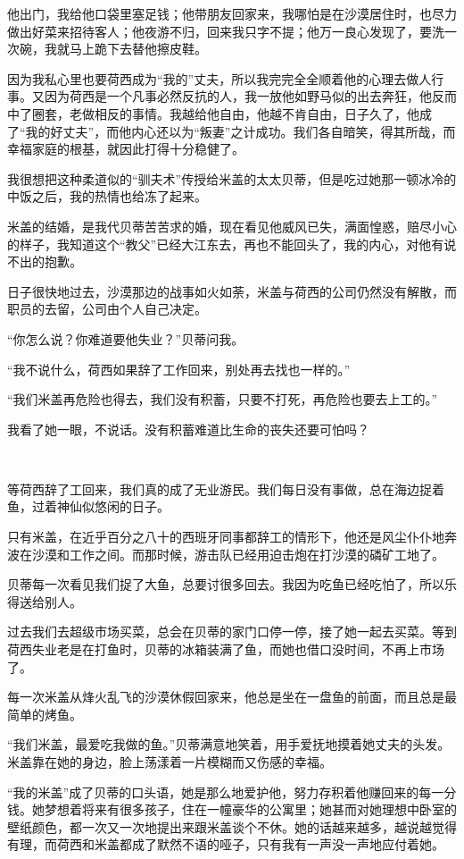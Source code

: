 \par 他出门，我给他口袋里塞足钱；他带朋友回家来，我哪怕是在沙漠居住时，也尽力做出好菜来招待客人；他夜游不归，回来我只字不提；他万一良心发现了，要洗一次碗，我就马上跪下去替他擦皮鞋。
\par 因为我私心里也要荷西成为“我的”丈夫，所以我完完全全顺着他的心理去做人行事。又因为荷西是一个凡事必然反抗的人，我一放他如野马似的出去奔狂，他反而中了圈套，老做相反的事情。我越给他自由，他越不肯自由，日子久了，他成了“我的好丈夫”，而他内心还以为“叛妻”之计成功。我们各自暗笑，得其所哉，而幸福家庭的根基，就因此打得十分稳健了。
\par 我很想把这种柔道似的“驯夫术”传授给米盖的太太贝蒂，但是吃过她那一顿冰冷的中饭之后，我的热情也给冻了起来。
\par 米盖的结婚，是我代贝蒂苦苦求的婚，现在看见他威风已失，满面惶惑，赔尽小心的样子，我知道这个“教父”已经大江东去，再也不能回头了，我的内心，对他有说不出的抱歉。
\par 日子很快地过去，沙漠那边的战事如火如荼，米盖与荷西的公司仍然没有解散，而职员的去留，公司由个人自己决定。
\par “你怎么说？你难道要他失业？”贝蒂问我。
\par “我不说什么，荷西如果辞了工作回来，别处再去找也一样的。”
\par “我们米盖再危险也得去，我们没有积蓄，只要不打死，再危险也要去上工的。”
\par 我看了她一眼，不说话。没有积蓄难道比生命的丧失还要可怕吗？
\par  
\par 等荷西辞了工回来，我们真的成了无业游民。我们每日没有事做，总在海边捉着鱼，过着神仙似悠闲的日子。
\par 只有米盖，在近乎百分之八十的西班牙同事都辞工的情形下，他还是风尘仆仆地奔波在沙漠和工作之间。而那时候，游击队已经用迫击炮在打沙漠的磷矿工地了。
\par 贝蒂每一次看见我们捉了大鱼，总要讨很多回去。我因为吃鱼已经吃怕了，所以乐得送给别人。
\par 过去我们去超级市场买菜，总会在贝蒂的家门口停一停，接了她一起去买菜。等到荷西失业老是在打鱼时，贝蒂的冰箱装满了鱼，而她也借口没时间，不再上市场了。
\par 每一次米盖从烽火乱飞的沙漠休假回家来，他总是坐在一盘鱼的前面，而且总是最简单的烤鱼。
\par “我们米盖，最爱吃我做的鱼。”贝蒂满意地笑着，用手爱抚地摸着她丈夫的头发。米盖靠在她的身边，脸上荡漾着一片模糊而又伤感的幸福。
\par “我的米盖”成了贝蒂的口头语，她是那么地爱护他，努力存积着他赚回来的每一分钱。她梦想着将来有很多孩子，住在一幢豪华的公寓里；她甚而对她理想中卧室的壁纸颜色，都一次又一次地提出来跟米盖谈个不休。她的话越来越多，越说越觉得有理，而荷西和米盖都成了默然不语的哑子，只有我有一声没一声地应付着她。
